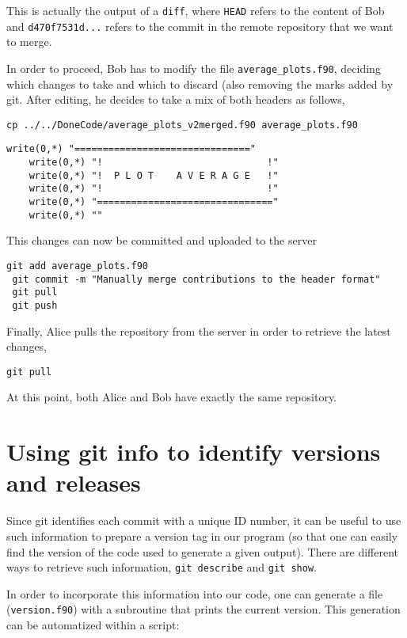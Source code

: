 \documentclass[a4paper,10pt]{article}
\begin{document}
This is actually the output of a \texttt{diff}, where \texttt{HEAD} refers to the content of Bob and \texttt{d470f7531d...} refers to the commit in the remote repository that we want to merge.

In order to proceed, Bob has to modify the file \texttt{average\_plots.f90}, deciding which changes to take and which to discard (also removing the marks added by git. After editing, he decides to take a mix of both headers as follows,

\begin{lstlisting}[style=AliceFake]
 cp ../../DoneCode/average_plots_v2merged.f90 average_plots.f90
\end{lstlisting}
\begin{lstlisting}[style=Text]
    write(0,*) "==============================="
    write(0,*) "!                             !"
    write(0,*) "!  P L O T    A V E R A G E   !"
    write(0,*) "!                             !"
    write(0,*) "==============================="
    write(0,*) ""
\end{lstlisting}

This changes can now be committed and uploaded to the server

\begin{lstlisting}[style=Bob]
 git add average_plots.f90
 git commit -m "Manually merge contributions to the header format"
 git pull
 git push
\end{lstlisting}

Finally, Alice pulls the repository from the server in order to retrieve the latest changes,

\begin{lstlisting}[style=Alice]
 git pull
\end{lstlisting}

At this point, both Alice and Bob have exactly the same repository.

\clearpage

\section{Using git info to identify versions and releases}
Since git identifies each commit with a unique ID number, it can be useful to use such information to prepare a version tag in our program (so that one can easily find the version of the code used to generate a given output). There are different ways to retrieve such information, \texttt{git describe} and \texttt{git show}.

In order to incorporate this information into our code, one can generate a file (\texttt{version.f90}) with a subroutine that prints the current version. This generation can be automatized within a script:
\end{document}
